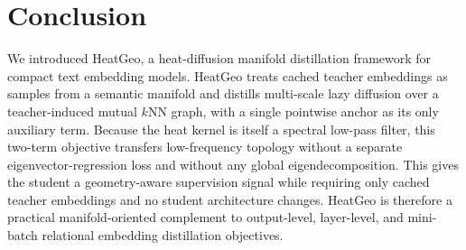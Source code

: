 \section{Conclusion}

We introduced HeatGeo, a heat-diffusion manifold distillation framework for compact text embedding models. HeatGeo treats cached teacher embeddings as samples from a semantic manifold and distills multi-scale lazy diffusion over a teacher-induced mutual $k$NN graph, with a single pointwise anchor as its only auxiliary term. Because the heat kernel is itself a spectral low-pass filter, this two-term objective transfers low-frequency topology without a separate eigenvector-regression loss and without any global eigendecomposition. This gives the student a geometry-aware supervision signal while requiring only cached teacher embeddings and no student architecture changes. HeatGeo is therefore a practical manifold-oriented complement to output-level, layer-level, and mini-batch relational embedding distillation objectives.
